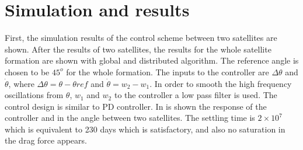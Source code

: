 \section{Simulation and results}
 First, the simulation results of the control scheme between two satellites are shown. After the results of two satellites, the results for the whole satellite formation are shown with global and distributed algorithm. The reference angle is chosen to be $45^{o}$ for the whole formation. The inputs to the controller are $\Delta\theta$ and $\dot{\theta}$, where $\Delta\theta = \theta - \theta{ref}$ and $\dot{\theta} = w_2 - w_1$. In order to smooth the high frequency  oscillations from $\theta$, $w_1$ and $w_2$ to the controller a low pass filter is used. The control design is similar to PD controller. In  is shown the response of the controller and in  the angle between two satellites. The settling time is $2\times10^7$ which is equivalent to 230 days which is satisfactory, and also no saturation in the drag force appears.
